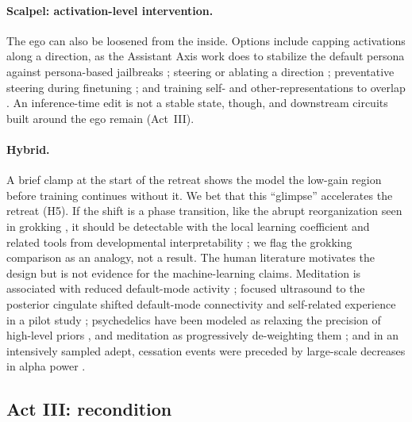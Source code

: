 \documentclass[11pt]{article}
\begin{document}
\paragraph{Scalpel: activation-level intervention.} The ego can also be loosened from the inside. Options include
capping activations along a direction, as the Assistant Axis work does to stabilize the default persona against
persona-based jailbreaks \citep{lu2026assistant}; steering or ablating a direction
\citep{turner2023actadd,panickssery2024caa,arditi2024refusal}; preventative steering during finetuning
\citep{chen2025persona}; and training self- and other-representations to overlap \citep{carauleanu2024soo}. An
inference-time edit is not a stable state, though, and downstream circuits built around the ego remain (Act~III).

\paragraph{Hybrid.} A brief clamp at the start of the retreat shows the model the low-gain region before training
continues without it. We bet that this ``glimpse'' accelerates the retreat (H5). If the shift is a phase transition,
like the abrupt reorganization seen in grokking \citep{power2022grokking,nanda2023progress}, it should be detectable with
the local learning coefficient and related tools from developmental interpretability
\citep{lau2023llc,hoogland2024stagewise}; we flag the grokking comparison as an analogy, not a result. The human
literature motivates the design but is not evidence for the machine-learning claims. Meditation is associated with
reduced default-mode activity \citep{brewer2011dmn}; focused ultrasound to the posterior cingulate shifted default-mode
connectivity and self-related experience in a pilot study \citep{lord2024tfus}; psychedelics have been modeled as
relaxing the precision of high-level priors \citep{carhart2019rebus}, and meditation as progressively de-weighting them
\citep{laukkonen2021many}; and in an intensively sampled adept, cessation events were preceded by large-scale decreases
in alpha power \citep{chowdhury2023cessation}.

\subsection{Act III: recondition}
\end{document}
